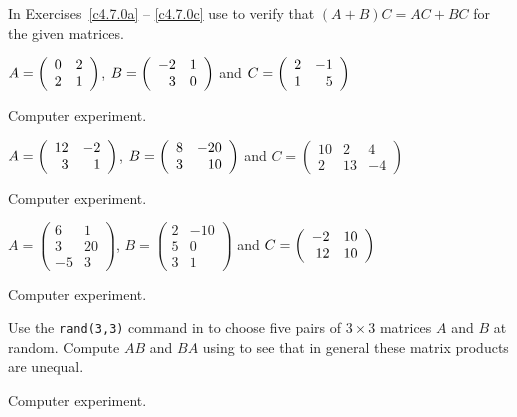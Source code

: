 \documentclass{ximera}
\begin{document}
\noindent In Exercises~\ref{c4.7.0a} -- \ref{c4.7.0c} use \Matlab to
verify that $(A+B)C = AC+BC$ for the given matrices.
\begin{exercise}  \label{c4.7.0a}
$A=\left(\begin{array}{rr} 0 & 2\\ 2 &1\end{array}\right)$, $B=\left(\begin{array}{rr} -2 & 1\\ 3 &0\end{array}\right)$ and $C=\left(\begin{array}{rr} 2 & -1\\ 1 &5\end{array}\right)$

\begin{solution}
Computer experiment.


\end{solution}
\end{exercise}
\begin{exercise}  \label{c4.7.0b}
$A=\left(\begin{array}{rr} 12 & -2\\ 3 &1\end{array}\right)$,
$B=\left(\begin{array}{rr} 8 & -20\\ 3 &10\end{array}\right)$ and
$C=\left(\begin{array}{rrr} 10 & 2 & 4\\ 2 & 13 & -4 \end{array}\right)$

\begin{solution}
Computer experiment.

\end{solution}
\end{exercise}
\begin{exercise}  \label{c4.7.0c}
$A=\left(\begin{array}{rr} 6 & 1 \\ 3 & 20 \\ -5 & 3\end{array}\right)$,
$B=\left(\begin{array}{rr} 2 & -10 \\ 5 & 0 \\ 3 & 1\end{array}\right)$ and
$C=\left(\begin{array}{rr} -2 & 10\\ 12 &10\end{array}\right)$

\begin{solution}
Computer experiment.

\end{solution}
\end{exercise}

\begin{exercise} \label{c4.7.2}
Use the {\tt rand(3,3)} command in \Matlab to choose five pairs of
$3\times 3$ matrices $A$ and $B$ at random.  Compute $AB$ and $BA$
using \Matlab to see that in general these matrix products are unequal.

\begin{solution}
Computer experiment.

\end{solution}
\end{exercise}
\end{document}
